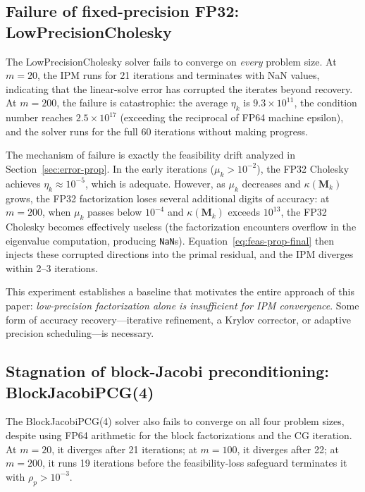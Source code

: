 \documentclass[11pt,twoside]{article}
\newcommand{\bM}{\mathbf{M}}
\begin{document}
\subsection{Failure of fixed-precision FP32: LowPrecisionCholesky}

The LowPrecisionCholesky solver fails to converge on \emph{every} problem
size.  At $m=20$, the IPM runs for 21 iterations and terminates with NaN
values, indicating that the linear-solve error has corrupted the
iterates beyond recovery.  At $m=200$, the failure is catastrophic: the
average $\eta_k$ is $9.3\times 10^{11}$, the condition number reaches
$2.5\times 10^{17}$ (exceeding the reciprocal of FP64 machine epsilon),
and the solver runs for the full 60 iterations without making progress.

The mechanism of failure is exactly the feasibility drift analyzed in
Section~\ref{sec:error-prop}.  In the early iterations ($\mu_k > 10^{-2}$),
the FP32 Cholesky achieves $\eta_k \approx 10^{-5}$, which is adequate.
However, as $\mu_k$ decreases and $\kappa(\bM_k)$ grows, the FP32
factorization loses several additional digits of accuracy: at $m=200$,
when $\mu_k$ passes below $10^{-4}$ and $\kappa(\bM_k)$ exceeds $10^{13}$,
the FP32 Cholesky becomes effectively useless (the factorization
encounters overflow in the eigenvalue computation, producing
\texttt{NaN}s).  Equation~\eqref{eq:feas-prop-final} then injects these
corrupted directions into the primal residual, and the IPM diverges
within 2--3 iterations.

This experiment establishes a baseline that motivates the entire approach
of this paper: \emph{low-precision factorization alone is insufficient
for IPM convergence}.  Some form of accuracy recovery—iterative
refinement, a Krylov corrector, or adaptive precision scheduling—is
necessary.

\subsection{Stagnation of block-Jacobi preconditioning: BlockJacobiPCG(4)}

The BlockJacobiPCG(4) solver also fails to converge on all four problem
sizes, despite using FP64 arithmetic for the block factorizations and the
CG iteration.  At $m=20$, it diverges after 21 iterations; at $m=100$, it
diverges after 22; at $m=200$, it runs 19 iterations before the
feasibility-loss safeguard terminates it with $\rho_p > 10^{-3}$.
\end{document}
